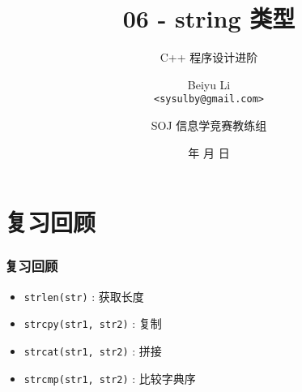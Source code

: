 \title[06 - string 类型]
{06 - string 类型}

\subtitle{C++ 程序设计进阶}

\author[Beiyu Li]
{Beiyu Li\\
\texttt{<sysulby@gmail.com>}}


\date[\today]
{\number\year 年 \number\month 月 \number\day 日}




\author[sysulby]
{SOJ 信息学竞赛教练组}

\begin{frame}
    \titlepage
\end{frame}
\setcounter{framenumber}{0} %


\section{复习回顾}


\begin{frame}[fragile]
    \frametitle{复习回顾}


     {
        \begin{itemize}
            \item \lstinline|strlen(str)| : 获取长度
            \item \lstinline|strcpy(str1, str2)| : 复制
            \item \lstinline|strcat(str1, str2)| : 拼接
            \item \lstinline|strcmp(str1, str2)| : 比较字典序
        \end{itemize}
    }
    
\end{frame}

